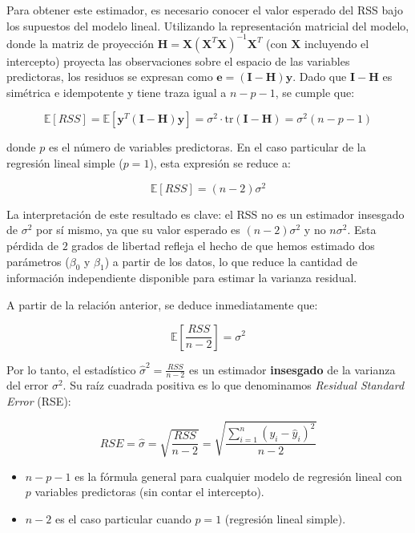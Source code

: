 \documentclass[12pt, a4paper]{article}
\begin{document}
Para obtener este estimador, es necesario conocer el valor esperado del RSS bajo los supuestos del modelo lineal. Utilizando la representación matricial del modelo, donde la matriz de proyección $\mathbf{H} = \mathbf{X}(\mathbf{X}^T\mathbf{X})^{-1}\mathbf{X}^T$ (con $\mathbf{X}$ incluyendo el intercepto) proyecta las observaciones sobre el espacio de las variables predictoras, los residuos se expresan como $\mathbf{e} = (\mathbf{I} - \mathbf{H})\mathbf{y}$. Dado que $\mathbf{I} - \mathbf{H}$ es simétrica e idempotente y tiene traza igual a $n - p - 1$, se cumple que:

\[
\mathbb{E}[RSS] = \mathbb{E}[\mathbf{y}^T(\mathbf{I} - \mathbf{H})\mathbf{y}] = \sigma^2 \cdot \text{tr}(\mathbf{I} - \mathbf{H}) = \sigma^2 (n - p - 1)
\]

donde $p$ es el número de variables predictoras. En el caso particular de la regresión lineal simple ($p=1$), esta expresión se reduce a:

\[
\boxed{\mathbb{E}[RSS] = (n-2)\sigma^2}
\]

La interpretación de este resultado es clave: el RSS no es un estimador insesgado de $\sigma^2$ por sí mismo, ya que su valor esperado es $(n-2)\sigma^2$ y no $n\sigma^2$. Esta pérdida de $2$ grados de libertad refleja el hecho de que hemos estimado dos parámetros ($\beta_0$ y $\beta_1$) a partir de los datos, lo que reduce la cantidad de información independiente disponible para estimar la varianza residual.

A partir de la relación anterior, se deduce inmediatamente que:

\[
\mathbb{E}\left[\frac{RSS}{n-2}\right] = \sigma^2
\]

Por lo tanto, el estadístico $\hat{\sigma}^2 = \frac{RSS}{n-2}$ es un estimador \textbf{insesgado} de la varianza del error $\sigma^2$. Su raíz cuadrada positiva es lo que denominamos \emph{Residual Standard Error} (RSE):

\[
\boxed{
RSE = \hat{\sigma} = \sqrt{\frac{RSS}{n-2}} = \sqrt{\frac{\sum_{i=1}^{n}(y_i - \hat{y}_i)^2}{n-2}}
}
\]


\begin{itemize}\item[-] $n-p-1$ es la fórmula general para cualquier modelo de regresión lineal con $p$ variables predictoras (sin contar el intercepto).
\item[-] $n-2$ es el caso particular cuando $p=1$ (regresión lineal simple).
\end{itemize}
\end{document}
